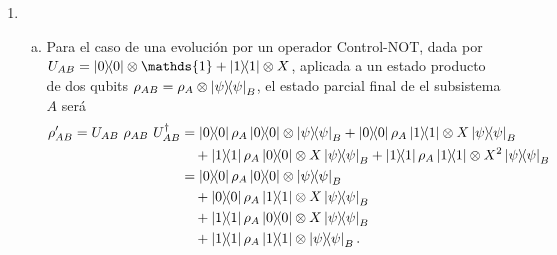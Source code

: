 \documentclass{scrartcl}
\DeclareRobustCommand{\[}{\begin{equation}}
\DeclareRobustCommand{\]}{\end{equation}}
\begin{document}
\begin{enumerate}
    
    
    \item
    \begin{enumerate}[a)]
        \item Para el caso de una evolución por un operador Control-NOT, dada por $U_{AB} = \dyad{0}{0} \otimes \mathds{1} + \dyad{1}{1} \otimes X$, aplicada a un estado producto de dos qubits $\rho_{AB} = \rho_A \otimes \dyad{\psi}{\psi}_B$, el estado parcial final de el subsistema $A$ será
        \begin{align}
            \rho_{AB}' = U_{AB} \ \rho_{AB} \ U_{AB}^\dagger &= \dyad{0}{0} \rho_A \dyad{0}{0} \otimes \dyad{\psi}{\psi}_B + \dyad{0}{0} \rho_A \dyad{1}{1} \otimes X \dyad{\psi}{\psi}_B \\
                &\quad + \dyad{1}{1} \rho_A \dyad{0}{0} \otimes X \dyad{\psi}{\psi}_B + \dyad{1}{1} \rho_A \dyad{1}{1} \otimes X^2 \dyad{\psi}{\psi}_B \\
                &= \dyad{0}{0} \rho_A \dyad{0}{0} \otimes \dyad{\psi}{\psi}_B \\
                &\quad + \dyad{0}{0} \rho_A \dyad{1}{1} \otimes X \dyad{\psi}{\psi}_B \\
                &\quad + \dyad{1}{1} \rho_A \dyad{0}{0} \otimes X \dyad{\psi}{\psi}_B \\
                &\quad + \dyad{1}{1} \rho_A \dyad{1}{1} \otimes \dyad{\psi}{\psi}_B.
        \end{align}
        

\end{enumerate}
\end{enumerate}
\end{document}
